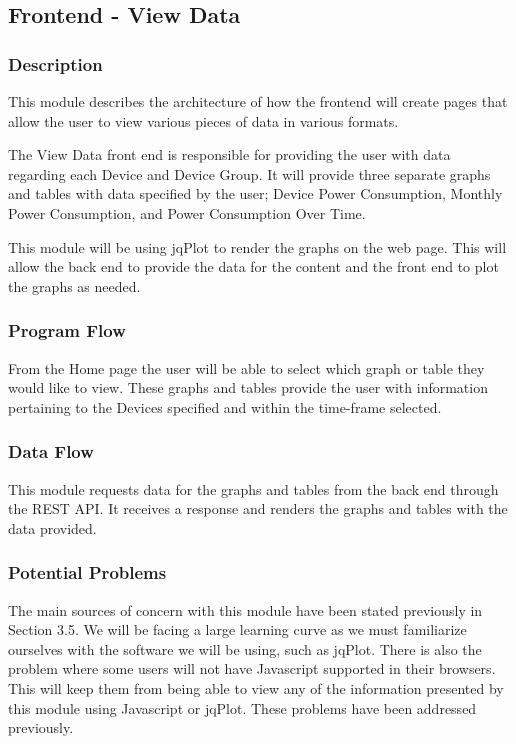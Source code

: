 
\subsection{Frontend - View Data}

\subsubsection{Description}

This module describes the architecture of how the frontend will create pages that allow the user to view various pieces of data in various formats.

The View Data front end is responsible for providing the user with data regarding each Device and Device Group. 
It will provide three separate graphs and tables with data specified by the user; 
Device Power Consumption, Monthly Power Consumption, and Power Consumption Over Time. 

This module will be using jqPlot to render the graphs on the web page. 
This will allow the back end to provide the data for the content and the front end to plot the graphs as needed. 

\subsubsection{Program Flow}

From the Home page the user will be able to select which graph or table they would like to view.  
These graphs and tables provide the user with information pertaining to the Devices specified and within the time-frame selected.  

\subsubsection{Data Flow}

This module requests data for the graphs and tables from the back end through the REST API. 
It receives a response and renders the graphs and tables with the data provided. 

\subsubsection{Potential Problems}

The main sources of concern with this module have been stated previously in Section 3.5. 
We will be facing a large learning curve as we must familiarize ourselves with the software we will be using, such as jqPlot. 
There is also the problem where some users will not have Javascript supported in their browsers. 
This will keep them from being able to view any of the information presented by this module using Javascript or jqPlot. 
These problems have been addressed previously. 

